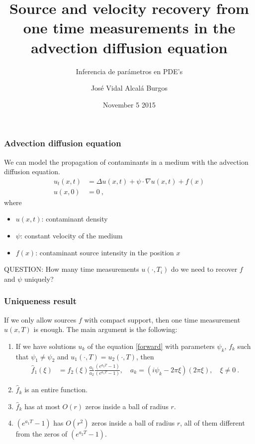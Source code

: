 \documentclass{beamer}
\title[Source and velocity recovery from one time measurements in the advection diffusion equation]{Source and velocity recovery from one time measurements in the advection diffusion equation}
\subtitle{Inferencia de parámetros en PDE's}
\author{José Vidal Alcalá Burgos}
\institute{Catedrático CONACYT - CIMAT}
\date{November 5 2015}
\begin{document}
\begin{frame}
\titlepage
\end{frame}


\begin{frame} 
\frametitle{Advection diffusion equation}
We can model the propagation of contaminants in a medium with the advection diffusion equation.
\begin{equation}\label{forward}
  \begin{split}
    u_t(x, t) &= \Delta u(x, t) + \psi \cdot \nabla u(x,t) + f(x)\\
    u(x, 0) &= 0\:,
  \end{split}
\end{equation}
where
\begin{itemize}
  \item $u(x,t)$: contaminant density
  \item $\psi$: \alert{constant} velocity of the medium
  \item $f(x)$: contaminant \alert{source} intensity in the position $x$
\end{itemize}

\alert{QUESTION:} How many time measurements $u(\cdot, T_i)$ do we need to recover $f$ and $\psi$ uniquely?
\end{frame}

\begin{frame} 
\frametitle{Uniqueness result}

If we only allow sources $f$ with \alert{compact support}, then \alert{one time} measurement $u(x,T)$ is enough. The main argument is the following:
\begin{enumerate}
  \item If we have solutions $u_k$ of the equation \eqref{forward} with parameters $\psi_k$, $f_k$ such that $\psi_1 \neq \psi_2$ and $u_1(\cdot, T)=u_2(\cdot, T)$, then
    \begin{equation*}
      \begin{split}
        \widehat{f}_{1}(\xi) &= \widehat{f}_2(\xi) \frac{a_1}{a_2}\frac{(e^{a_2 T} - 1)}{(e^{a_1 T} - 1)},\quad
        a_{k} = (i \psi_k - 2 \pi \xi)(2 \pi \xi), \quad \xi\neq 0 \:.
      \end{split}
    \end{equation*}
  \item $\widehat{f}_{k}$ is an \alert{entire} function.
  \item $\widehat{f}_{k}$ has at most \alert{$O(r)$ zeros} inside a ball of radius $r$.
  \item $(e^{a_1 T} - 1)$ has \alert{$O(r^2)$} zeros inside a ball of radius $r$, all of them different from the zeros of $(e^{a_2 T} - 1)$.
\end{enumerate}

\end{frame}
\end{document}
